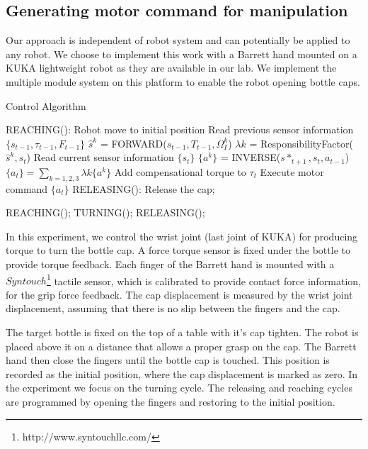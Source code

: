 \subsection{Generating motor command for manipulation}
\label{cha4:sec3:command}
Our approach is independent of robot system and can potentially be applied to any robot. We choose to implement this work with a Barrett hand mounted on a KUKA lightweight robot as they are available in our lab. We implement the multiple module system on this platform to enable the robot opening bottle caps.

\begin{algorithm}
  \caption{Control Algorithm}
  \begin{algorithmic}[1]
    \State REACHING(): Robot move to initial position\;
          \State Read previous sensor information $\{s_{t-1},\tau_{t-1},F_{t-1}\}$\;
            \State $\hat{s}^{k}$ = FORWARD($s_{t-1},T_{t-1},\Omega_I^k$) \;
          \EndFor
            \State $\lambda{k}$ = ResponsibilityFactor($\hat{s}^{k},s_t$) \;
          \EndFor
          \State Read current sensor information $\{s_{t}\}$\;
            \State $\{a^k\}$ = INVERSE($s*_{t+1},s_t,a_{t-1}$) \;
          \EndFor
          \State $\{a_t\} = \sum_{k=1,2,3}\lambda{k}\{a^k\}$\;\;
          \State Add compensational torque to $\tau_t$\;
          \State Execute motor command $\{a_t\}$ \;
          \State RELEASING(): Release the cap;
        \EndFunction
    \EndFor

        \State REACHING();
        \State TURNING();
        \State RELEASING();
    \EndWhile

  \end{algorithmic}
  \label{code:control}
\end{algorithm}


In this experiment, we control the wrist joint (last joint of KUKA) for producing torque to turn the bottle cap. A force torque sensor is fixed under the bottle to provide torque feedback. Each finger of the Barrett hand is mounted with a $Syntouch$\footnote{http://www.syntouchllc.com/} tactile sensor, which is calibrated to provide contact force information, for the grip force feedback. The cap displacement is measured by the wrist joint displacement, assuming that there is no slip between the fingers and the cap.

The target bottle is fixed on the top of a table with it's cap tighten. The robot is placed above it on a distance that allows a proper grasp on the cap. The Barrett hand then close the fingers until the bottle cap is touched. This position is recorded as the initial position, where the cap displacement is marked as zero. In the experiment we focus on the turning cycle. The releasing and reaching cycles are programmed by opening the fingers and restoring to the initial position.

